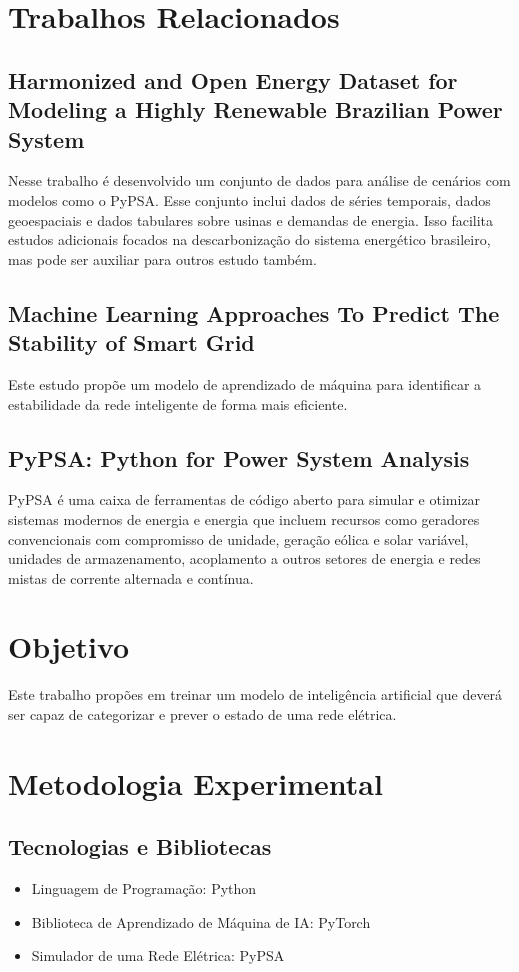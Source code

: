 \documentclass[a4paper,12pt]{article}
\begin{document}
\section{Trabalhos Relacionados}
\subsection{Harmonized and Open Energy Dataset for Modeling a Highly Renewable Brazilian Power System}

Nesse trabalho é desenvolvido um conjunto de dados para análise de cenários com modelos como o PyPSA.
Esse conjunto inclui dados de séries temporais, dados geoespaciais e dados tabulares sobre usinas e demandas de energia.
Isso facilita estudos adicionais focados na descarbonização do sistema energético brasileiro, mas pode ser auxiliar para outros estudo também.

\subsection{Machine Learning Approaches To Predict The Stability of Smart Grid}

Este estudo propõe um modelo de aprendizado de máquina para identificar a estabilidade da rede inteligente de forma mais eficiente.

\subsection{PyPSA: Python for Power System Analysis}
PyPSA é uma caixa de ferramentas de código aberto para simular e otimizar sistemas modernos de energia e energia que incluem recursos como geradores convencionais com compromisso de unidade, geração eólica e solar variável, unidades de armazenamento, acoplamento a outros setores de energia e redes mistas de corrente alternada e contínua.

\section{Objetivo}

Este trabalho propões em treinar um modelo de inteligência artificial que deverá ser capaz de categorizar e prever o estado de uma rede elétrica.

\section{Metodologia Experimental}

\subsection{Tecnologias e Bibliotecas}
\begin{itemize}
    \item Linguagem de Programação: Python
    \item Biblioteca de Aprendizado de Máquina de IA: PyTorch
    \item Simulador de uma Rede Elétrica: PyPSA
\end{itemize}
\end{document}
